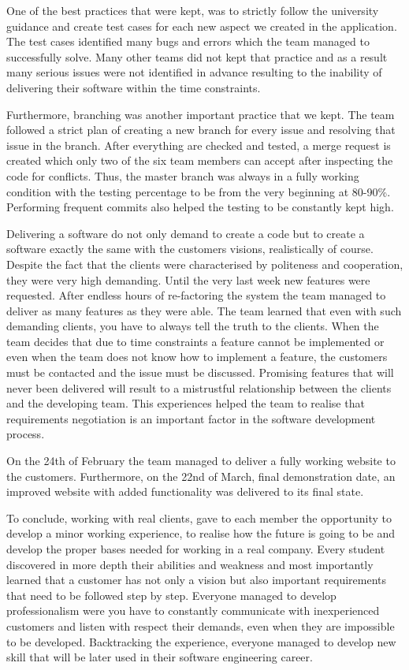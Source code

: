 \documentclass{l3proj}
\begin{document}
One of the best practices that were kept, was to strictly follow the university guidance and create test cases for each new aspect we created in the application. The test cases identified many bugs and errors which the team managed to successfully solve. Many other teams did not kept that practice and as a result many serious issues were not identified in advance resulting to the inability of delivering their software within the time constraints.

Furthermore, branching was another important practice that we kept. The team followed a strict plan of creating a new branch for every issue and resolving that issue in the branch. After everything are checked and tested, a merge request is created which only two of the six team members can accept after inspecting the code for conflicts. Thus, the master branch was always in a fully working condition with the testing percentage to be from the very beginning at 80-90\%. Performing frequent commits also helped the testing to be constantly kept high.

Delivering a software do not only demand to create a code but to create a software exactly the same with the customers visions, realistically of course. Despite the fact that the clients were characterised by politeness and cooperation, they were very high demanding. Until the very last week new features were requested. After endless hours of re-factoring the system the team managed to deliver as many features as they were able. The team learned that even with such demanding clients, you have to always tell the truth to the clients. When the team decides that due to time constraints a feature cannot be implemented or even when the team does not know how to implement a feature, the customers must be contacted and the issue must be discussed. Promising features that will never been delivered will result to a mistrustful relationship between the clients and the developing team. This experiences helped the team to realise that requirements negotiation is an important factor in the software development process.

On the 24th of February the team managed to deliver a fully working website to the customers. Furthermore, on the 22nd of March, final demonstration date, an improved website with added functionality was delivered to its final state.

To conclude, working with real clients, gave to each member the opportunity to develop a minor working experience, to realise how the future is going to be and develop the proper bases needed for working in a real company. Every student discovered in more depth their abilities and weakness and most importantly learned that a customer has not only a vision but also important requirements that need to be followed step by step. Everyone managed to develop professionalism were you have to constantly communicate with inexperienced customers and listen with respect their demands, even when they are impossible to be developed. Backtracking the experience, everyone managed to develop new skill that will be later used in their software engineering career.
\end{document}
